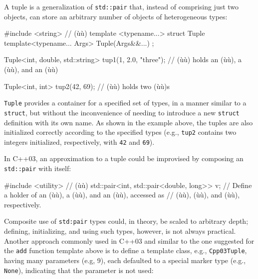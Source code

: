 A tuple is a generalization of \lstinline!std::pair! that, instead of
comprising just two objects, can store an arbitrary number of objects of
heterogeneous types:

\begin{emcppshiddenlisting}[emcppsbatch=e4]
#include <string>  // (ù{}ù)
template <typename...>
struct Tuple {
    template<typename... Args>
    Tuple(Args&&...) {}
};
\end{emcppshiddenlisting}
\begin{emcppslisting}[emcppsbatch=e4]
Tuple<int, double, std::string> tup1(1, 2.0, "three");
    // (ù{}ù) holds an (ù{}ù), a (ù{}ù), and an (ù{}ù)

Tuple<int, int> tup2(42, 69);
    // (ù{}ù) holds two (ù{}ù)s
\end{emcppslisting}
    

\noindent \lstinline!Tuple! provides a container for a specified set of types, in a
manner similar to a \lstinline!struct!, but without the inconvenience of
needing to introduce a new \lstinline!struct! definition with its own name.
As shown in the example above, the tuples are also initialized correctly
according to the specified types (e.g., \lstinline!tup2! contains two
integers initialized, respectively, with \lstinline!42! and \lstinline!69!).

In C++03, an approximation to a tuple could be improvised by composing
an \lstinline!std::pair! with itself:

\begin{emcppslisting}
#include <utility>  // (ù{}ù)
std::pair<int, std::pair<double, long>> v;
    // Define a holder of an (ù{}ù), a (ù{}ù), and an (ù{}ù), accessed as
    // (ù{}ù), (ù{}ù), and (ù{}ù), respectively.
\end{emcppslisting}
    

\noindent Composite use of \lstinline!std:pair! types could, in theory, be scaled to
arbitrary depth; defining, initializing, and using such types, however,
is not always practical. Another approach commonly used in C++03 and
similar to the one suggested for the \lstinline!add! function template
above is to define a template class, e.g., \lstinline!Cpp03Tuple!, having
many parameters (e.g, 9), each defaulted to a special marker type (e.g.,
\lstinline!None!), indicating that the parameter is not used:

